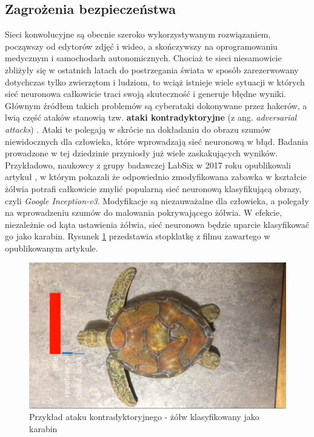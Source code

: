 \subsection{Zagrożenia bezpieczeństwa}
Sieci konwolucyjne są obecnie szeroko wykorzystywanym rozwiązaniem, począwszy od edytorów zdjęć i wideo, a skończywszy na oprogramowaniu medycznym i samochodach autonomicznych. Chociaż te sieci niesamowicie zbliżyły się w ostatnich latach do postrzegania świata w sposób zarezerwowany dotychczas tylko zwierzętom i ludziom, to wciąż istnieje wiele sytuacji w których sieć neuronowa całkowicie traci swoją skuteczność i generuje błędne wyniki. Głównym źródłem takich problemów są cyberataki dokonywane przez hakerów, a lwią część ataków stanowią tzw. \textbf{ataki kontradyktoryjne} (z ang. \textit{adversarial attacks}) \cite{dickson:adversarialMl}. Ataki te polegają w skrócie na dokładaniu do obrazu szumów niewidocznych dla człowieka, które wprowadzają sieć neuronową w błąd. Badania prowadzone w tej dziedzinie przyniosły już wiele zaskakujących wyników. Przykładowo, naukowcy z grupy badawczej LabSix w 2017 roku opublikowali artykuł \cite{labsix:foolingNNs}, w którym pokazali że odpowiednio zmodyfikowana zabawka w kształcie żółwia potrafi całkowicie zmylić popularną sieć neuronową klasyfikującą obrazy, czyli \textit{Google Inception-v3}. Modyfikacje są niezauważalne dla człowieka, a polegały na wprowadzeniu szumów do malowania pokrywającego żółwia. W efekcie, niezależnie od kąta ustawienia żółwia, sieć neuronowa będzie uparcie klasyfikować go jako karabin. Rysunek \ref{TurtleAdversarialAttack} przedstawia stopklatkę z filmu zawartego w opublikowanym artykule. \\

\begin{figure}[h]
\begin{center}
\includegraphics[width=15cm]{resources/figures/ai-adversarial-attack-turtle.png}
\caption{Przykład ataku kontradyktoryjnego - żółw klasyfikowany jako karabin}
\label{TurtleAdversarialAttack}
\end{center}
\end{figure}


